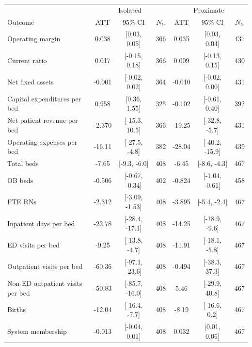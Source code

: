 \begin{tabular}{lccrccr}
 & \multicolumn{3}{c}{Isolated} & \multicolumn{3}{c}{Proximate} \\
Outcome & ATT & 95\% CI & $N_{tr}$ & ATT & 95\% CI & $N_{tr}$ \\
Operating margin & 0.038 & [0.03, 0.05] & 366 & 0.035 & [0.03, 0.04] & 431 \\
Current ratio & 0.017 & [-0.15, 0.18] & 366 & 0.009 & [-0.13, 0.15] & 430 \\
Net fixed assets & -0.001 & [-0.02, 0.02] & 364 & -0.010 & [-0.02, 0.00] & 431 \\
Capital expenditures per bed & 0.958 & [0.36, 1.55] & 325 & -0.102 & [-0.61, 0.40] & 392 \\
Net patient revenue per bed & -2.370 & [-15.3, 10.5] & 366 & -19.25 & [-32.8, -5.7] & 431 \\
Operating expenses per bed & -16.11 & [-27.5, -4.8] & 382 & -28.04 & [-40.2, -15.9] & 439 \\
Total beds & -7.65 & [-9.3, -6.0] & 408 & -6.45 & [-8.6, -4.3] & 467 \\
OB beds & -0.506 & [-0.67, -0.34] & 402 & -0.824 & [-1.04, -0.61] & 458 \\
FTE RNs & -2.312 & [-3.09, -1.53] & 408 & -3.895 & [-5.4, -2.4] & 467 \\
Inpatient days per bed & -22.78 & [-28.4, -17.1] & 408 & -14.25 & [-18.9, -9.6] & 467 \\
ED visits per bed & -9.25 & [-13.8, -4.7] & 408 & -11.91 & [-18.1, -5.8] & 467 \\
Outpatient visits per bed & -60.36 & [-97.1, -23.6] & 408 & -0.494 & [-38.3, 37.3] & 467 \\
Non-ED outpatient visits per bed & -50.83 & [-85.7, -16.0] & 408 & 5.46 & [-29.9, 40.8] & 467 \\
Births & -12.04 & [-16.4, -7.7] & 408 & -8.19 & [-16.6, 0.2] & 467 \\
System membership & -0.013 & [-0.04, 0.01] & 408 & 0.032 & [0.01, 0.06] & 467 \\
\end{tabular}
